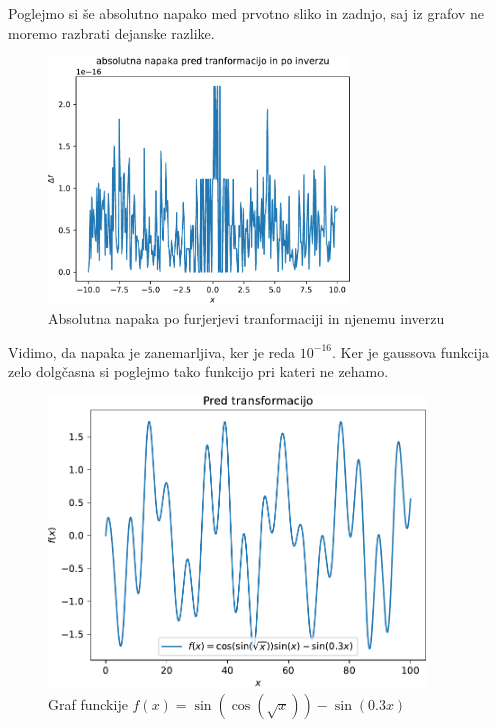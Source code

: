 Poglejmo si še absolutno napako med prvotno sliko in zadnjo, saj iz grafov ne moremo razbrati
dejanske razlike.
\begin{figure}[h]
    \centering
    \includegraphics[width=8cm]{pdfs/abs_napaka.pdf}
    \caption{Absolutna napaka po furjerjevi tranformaciji in njenemu inverzu}
\end{figure}
Vidimo, da napaka je zanemarljiva, ker je reda $10^{-16}$.
\newpage
Ker je gaussova funkcija zelo dolgčasna si poglejmo tako funkcijo pri kateri ne zehamo.
\begin{figure}[h]
    \centering
    \includegraphics[width=10cm]{pdfs/pred.pdf}
    \caption{Graf funckije $f(x) = \sin(\cos(\sqrt{x}))-\sin(0.3x)$}
\end{figure}
\newpage
